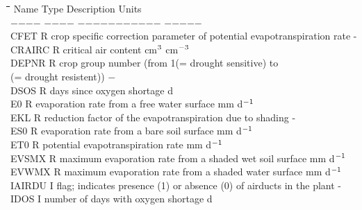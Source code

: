 \begin{tabbing}
\hspace{1.27cm}\=\hspace{1.27cm}\=\hspace{1.27cm}\=\hspace{1.27cm}\=%
\hspace{1.27cm}\=\hspace{1.27cm}\=\hspace{1.27cm}\=\hspace{1.27cm}\=%
\hspace{1.27cm}\=\hspace{1.27cm}\=\kill
Name    \> \> Type   \> Description                                        \> \> \> \> \> \> \> Units\\
$-$$-$$-$$-$    \> \> $-$$-$$-$$-$   \> $-$$-$$-$$-$$-$$-$$-$$-$$-$$-$$-$                                        \> \> \> \> \> \> \> $-$$-$$-$$-$$-$\\
CFET\> \> R\> crop specific correction parameter of potential evapotranspiration rate\> \> \> \> \> \> \> -\\
CRAIRC\> \> R\> critical air content\> \> \> \> \> \> \> cm$^{{\rm 3}}$ cm$^{{\rm -3}}$\\
DEPNR\> \> R   \> crop group number (from 1(= drought sensitive) to \\
\>\> (= drought resistent))   \> \> \> \> \> \> \> $-$\\
DSOS\> \> R\> days since oxygen shortage\> \> \> \> \> \> \> d\\
E0\> \> R\> evaporation rate from a free water surface\> \> \> \> \> \> \> mm d$^{{\rm -1}}$\\
EKL\> \> R\> reduction factor of the evapotranspiration due to shading\> \> \> \> \> \> \> -\\
ES0\> \> R\> evaporation rate from a bare soil surface\> \> \> \> \> \> \> mm d$^{{\rm -1}}$\\
ET0\> \> R\> potential evapotranspiration rate\> \> \> \> \> \> \> mm d$^{{\rm -1}}$\\
EVSMX\> \> R\> maximum evaporation rate from a shaded wet soil surface\> \> \> \> \> \> \> mm d$^{{\rm -1}}$\\
EVWMX\> \> R\> maximum evaporation rate from a shaded water surface\> \> \> \> \> \> \> mm d$^{{\rm -1}}$\\
IAIRDU\> \> I\> flag; indicates presence (1) or absence (0) of airducts in the plant \> \> \> \> \> \> \> -\\
IDOS\> \> I\> number of days with oxygen shortage\> \> \> \> \> \> \> d\\

\end{tabbing}
